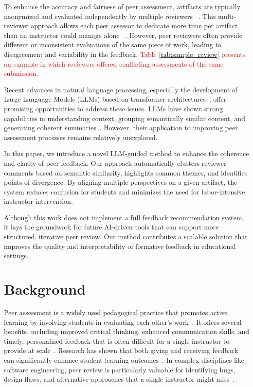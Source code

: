 \documentclass[manuscript,review, anonymous]{acmart}
\begin{document}
To enhance the accuracy and fairness of peer assessment, artifacts are typically anonymized and evaluated independently by multiple reviewers ~\cite{gehringer2014survey}. This multi-reviewer approach allows each peer assessor to dedicate more time per artifact than an instructor could manage alone ~\cite{cambre2018juxtapeer}. However, peer reviewers often provide different or inconsistent evaluations of the same piece of work, leading to disagreement and variability in the feedback. \textcolor{red}{Table \ref{tab:sample_review} presents an example in which reviewers offered conflicting assessments of the same submission.}

Recent advances in natural language processing, especially the development of Large Language Models (LLMs) based on transformer architectures~\cite{vaswani2017attention, devlin2018bert}, offer promising opportunities to address these issues. LLMs have shown strong capabilities in understanding context, grouping semantically similar content, and generating coherent summaries~\cite{openai2023gpt4}. However, their application to improving peer assessment processes remains relatively unexplored.

In this paper, we introduce a novel LLM-guided method to enhance the coherence and clarity of peer feedback. Our approach automatically clusters reviewer comments based on semantic similarity, highlights common themes, and identifies points of divergence. By aligning multiple perspectives on a given artifact, the system reduces confusion for students and minimizes the need for labor-intensive instructor intervention.

Although this work does not implement a full feedback recommendation system, it lays the groundwork for future AI-driven tools that can support more structured, iterative peer review. Our method contributes a scalable solution that improves the quality and interpretability of formative feedback in educational settings.

\section{Background}

Peer assessment is a widely used pedagogical practice that promotes active learning by involving students in evaluating each other’s work~\cite{topping1998peer}. It offers several benefits, including improved critical thinking, enhanced communication skills, and timely, personalized feedback that is often difficult for a single instructor to provide at scale~\cite{sadler2006impact, rada1994collaborative}. Research has shown that both giving and receiving feedback can significantly enhance student learning outcomes~\cite{li2019power, cevık2015assessor}. In complex disciplines like software engineering, peer review is particularly valuable for identifying bugs, design flaws, and alternative approaches that a single instructor might miss~\cite{cambre2018juxtapeer, graner1987revision}.
\end{document}
